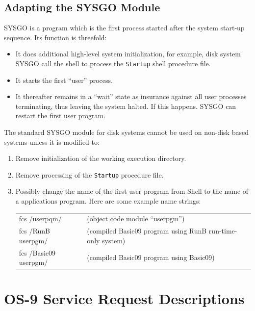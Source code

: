 \documentclass[
]{article}
\newcounter{none} %
\begin{document}
\subsection{Adapting the SYSGO Module}

SYSGO is a program which is the first process started after the system
start-up sequence. Its function is threefold:

\begin{itemize}
\item
  It does additional high-level system initialization, for example, disk
  system SYSGO call the shell to process the \texttt{Startup} shell
  procedure file.
\item
  It starts the first ``user'' process.
\item
  It thereafter remains in a ``wait'' state as insurance against all
  user processes terminating, thus leaving the system halted. If this
  happens. SYSGO can restart the first user program.
\end{itemize}

The standard SYSGO module for disk systems cannot be used on non-disk
based systems unless it is modified to:

\begin{enumerate}
\def\labelenumi{\arabic{enumi}.}
\item
  Remove initialization of the working execution directory.
\item
  Remove processing of the \texttt{Startup} procedure file.
\item
  Possibly change the name of the first user program from Shell to the
  name of a applications program. Here are some example name strings:

  {\def\LTcaptype{none} %
  \begin{longtable}[]{@{}ll@{}}
  \toprule\noalign{}
  \endhead
  \bottomrule\noalign{}
  \endlastfoot
  fcs /userpqm/ & (object code module ``userpgm'') \\
  fcs /RunB userpgm/ & (compiled Basie09 program using RunB
  run-time-only system) \\
  fcs /Basic09 userpgm/ & (compiled Basic09 program using Basic09) \\
  \end{longtable}
  }
\end{enumerate}

\section{OS-9 Service Request Descriptions}
\end{document}
